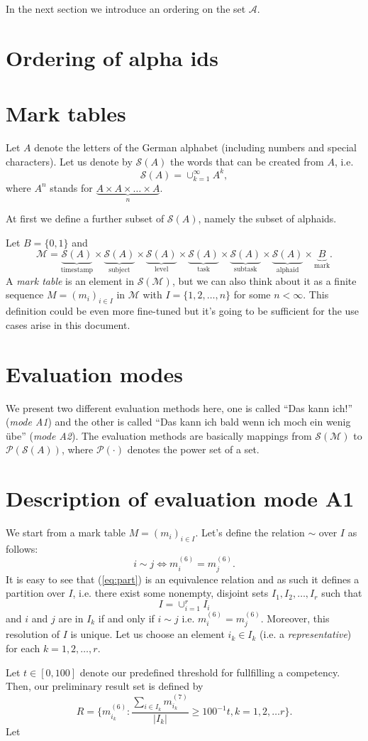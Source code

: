 \documentclass{scrartcl}
\begin{document}
In the next section we introduce an ordering on the set $\mathcal{A}$.

\section{Ordering of alpha ids}


\section{Mark tables}
Let $A$ denote the letters of the German alphabet (including numbers and special characters). Let us denote by $\mathcal{S}(A)$ the words that can be created from $A$, i.e.
$$\mathcal{S}(A)=\cup_{k=1}^{\infty}A^k,$$
where $A^n$ stands for $\underbrace{A\times A\times\ldots \times A}_{n}$. 

At first we define a further subset of $\mathcal{S}(A)$, namely the subset of alphaids.

Let $B=\{0,1\}$ and $$\mathcal{M}=\underbrace{\mathcal{S}(A)}_{\mbox{timestamp}}\times\underbrace{\mathcal{S}(A)}_{\mbox{subject}}\times\underbrace{\mathcal{S}(A)}_{\mbox{level}}\times\underbrace{\mathcal{S}(A)}_{\mbox{task}}\times\underbrace{\mathcal{S}(A)}_{\mbox{subtask}}\times\underbrace{\mathcal{S}(A)}_{\mbox{alphaid}}\times \underbrace{B}_{\mbox{mark}}.$$ A \emph{mark table} is an element in $\mathcal{S}(\mathcal{M})$, but we can also think about it as a finite sequence $M=(m_i)_{i\in I}$ in $\mathcal{M}$ with $I=\{1,2,\ldots,n\}$ for some $n<\infty$. This definition could be even more fine-tuned but it's going to be sufficient for the use cases arise in this document.

\section{Evaluation modes}
We present two different evaluation methods here, one is called ``Das kann ich!'' (\emph{mode A1}) and the other is called ``Das kann ich bald wenn ich moch ein wenig übe'' (\emph{mode A2}). The evaluation methods are basically mappings from $\mathcal{S}({\mathcal{M}})$ to $\mathcal{P}({\mathcal{S}(A)})$, where $\mathcal{P}(\cdot)$ denotes the power set of a set.

\section{Description of evaluation mode A1}
We start from a mark table $M=(m_i)_{i\in I}$. Let's define the relation $\sim$ over $I$ as follows:
\begin{equation}
i\sim j \Leftrightarrow m_i^{(6)}=m_j^{(6)}.
\label{eq:part}
\end{equation}
It is easy to see that (\ref{eq:part}) is an equivalence relation and as such it defines a partition over $I$, i.e. there exist some nonempty, disjoint sets $I_1,I_2,\ldots,I_r$ such that $$I=\cup_{i=1}^r I_i$$ and $i$ and $j$ are in $I_k$ if and only if $i\sim j$ i.e. $m_i^{(6)}=m_j^{(6)}$. Moreover, this resolution of $I$ is unique. Let us choose an element $i_k\in I_k$ (i.e. a \emph{representative}) for each $k=1,2,\ldots,r$.

Let $t\in [0,100]$ denote our predefined threshold for fullfilling a competency. Then, our preliminary result set is defined by 
$$R=\{m_{i_k}^{(6)}: \frac{\sum_{i \in I_k}m_{i_k}^{(7)}}{|I_k|}\geq 100^{-1}t, k=1,2,\ldots r\}.$$
Let 
\end{document}
